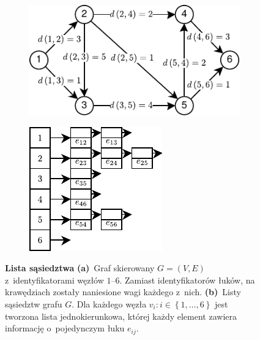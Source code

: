 \begin{figure}[!htbp]
	\centering
	\null\hfill
	\begin{subfigure}[b]{0.5\textwidth}
		\includegraphics[width=\textwidth]{Chapter_I/ADJACENCY-LIST-Example/a.pdf}
		\caption{}
		\label{fig:adjacencyList:a}
	\end{subfigure}
	\hfill
	\begin{subfigure}[b]{0.3\textwidth}
		\includegraphics[width=\textwidth]{Chapter_I/ADJACENCY-LIST-Example/b.pdf}
		\caption{}
		\label{fig:adjacencyList:b}
	\end{subfigure}
	\hfill\null
	\caption{
		\textbf{Lista sąsiedztwa}
		\textbf{(a)}~Graf skierowany $G = \left( V, E \right)$ z~identyfikatorami węzłów $1$--$6$.
		Zamiast identyfikatorów łuków, na krawędziach zostały naniesione wagi każdego z~nich.
		\textbf{(b)}~Listy sąsiedztw grafu $G$.
		Dla każdego węzła $v_{i} : i \in \left\{ 1, \dots, 6 \right\}$ jest tworzona lista jednokierunkowa, której każdy element zawiera informację o~pojedynczym łuku $e_{ij}$.
	}
	\label{fig:adjacencyList}
\end{figure}

